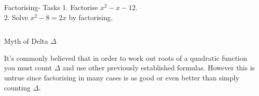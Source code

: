 \documentclass[final]{beamer}
\newlength{\onecolwid}
\newlength{\twocolwid}
\begin{document}
\begin{frame}[t]
\begin{columns}[t]
\begin{column}{\twocolwid}
\begin{columns}[t,totalwidth=\twocolwid]
\begin{column}{\onecolwid}\vspace{-.6in} %


\begin{block}{Factorising- Tasks}
1. Factorise $x^2-x-12$.
\[\]
\[\]
\[\]
\[\]
2. Solve $x^2-8=2x$ by factorising.

\end{block}


\end{column} %

\end{columns} %


\begin{alertblock}{Myth of Delta $\Delta$}

It's commonly believed that in order to work out roots of a quadratic function you must count $\Delta$ and use other previously established formulas. However this is untrue since factorising in many cases is as good or even better than simply counting $\Delta$.

\end{alertblock} 


\begin{columns}[t,totalwidth=\twocolwid] %

\begin{column}{\onecolwid} %



\end{column}
\end{columns}
\end{column}
\end{columns}
\end{frame}
\end{document}

